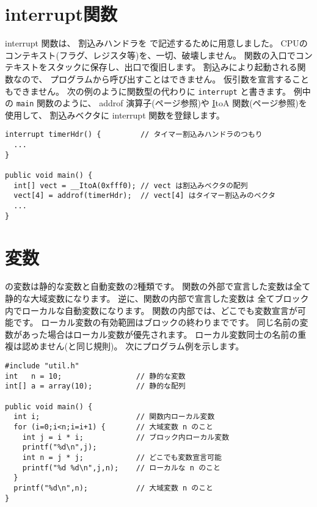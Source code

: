 \section{interrupt関数}
interrupt 関数は、
割込みハンドラを \cmml で記述するために用意しました。
CPUのコンテキスト(フラグ、レジスタ等)を、一切、破壊しません。
関数の入口でコンテキストをスタックに保存し、出口で復旧します。
割込みにより起動される関数なので、
プログラムから呼び出すことはできません。
仮引数を宣言することもできません。
次の例のように関数型の代わりに \verb/interrupt/ と書きます。
例中の \verb/main/ 関数のように、
addrof 演算子(\pageref{chap3:addrof}ページ参照)や
\ul \ul ItoA 関数(\pageref{chap4:itoa}ページ参照)を使用して、
割込みベクタに interrupt 関数を登録します。

\begin{mylist}
\begin{verbatim}
interrupt timerHdr() {         // タイマー割込みハンドラのつもり
  ...
}

public void main() {
  int[] vect = __ItoA(0xfff0); // vect は割込みベクタの配列
  vect[4] = addrof(timerHdr);  // vect[4] はタイマー割込みのベクタ
  ...
}
\end{verbatim}
\end{mylist}


\section{変数}

\cmml の変数は静的な変数と自動変数の2種類です。
関数の外部で宣言した変数は全て静的な大域変数になります。
逆に、関数の内部で宣言した変数は
全てブロック内でローカルな自動変数になります。
関数の内部では、どこでも変数宣言が可能です。
ローカル変数の有効範囲はブロックの終わりまでです。
同じ名前の変数があった場合はローカル変数が優先されます。
ローカル変数同士の名前の重複は認めません(\javal と同じ規則)。
次にプログラム例を示します。

\begin{mylist}
\begin{verbatim}
#include "util.h"
int   n = 10;                 // 静的な変数
int[] a = array(10);          // 静的な配列

public void main() {
  int i;                      // 関数内ローカル変数
  for (i=0;i<n;i=i+1) {       // 大域変数 n のこと
    int j = i * i;            // ブロック内ローカル変数
    printf("%d\n",j);
    int n = j * j;            // どこでも変数宣言可能
    printf("%d %d\n",j,n);    // ローカルな n のこと
  }                        
  printf("%d\n",n);           // 大域変数 n のこと
}
\end{verbatim}
\end{mylist}

